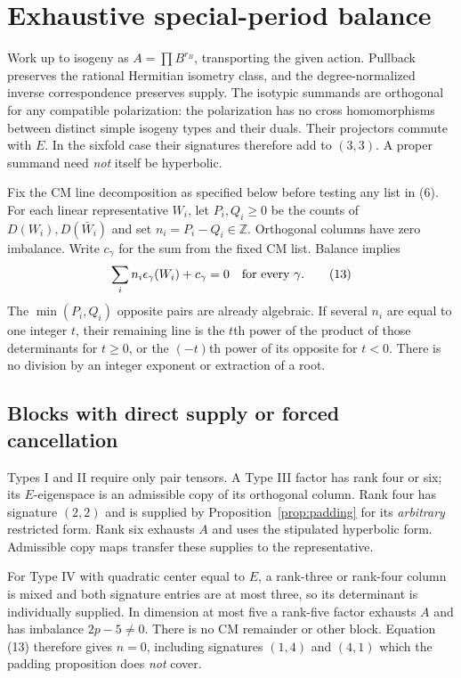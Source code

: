 \documentclass[11pt]{article}
\newcommand{\Z}{\mathbb Z}
\theoremstyle{remark}
\begin{document}
\section{Exhaustive special-period balance}

Work up to isogeny as $A=\prod B^{r_B}$, transporting the given action.
Pullback preserves the rational Hermitian isometry class, and the
degree-normalized inverse correspondence preserves supply.
The isotypic summands are orthogonal for any compatible polarization:
the polarization has no cross homomorphisms between distinct simple
isogeny types and their duals. Their projectors commute with $E$.
In the sixfold case their signatures therefore add to $(3,3)$.
A proper summand need \emph{not} itself be hyperbolic.

Fix the CM line decomposition as specified below before testing any
list in (6). For each linear representative $W_i$, let
$P_i,Q_i\geq0$ be the counts of $D(W_i),D(\bar W_i)$ and set
$n_i=P_i-Q_i\in\Z$. Orthogonal columns have zero imbalance.
Write $c_\gamma$ for the sum from the fixed CM list. Balance implies
\[
 \sum_i n_i\epsilon_\gamma(W_i)+c_\gamma=0
                    \quad\hbox{for every }\gamma.
 \tag{13}\label{eq:net}
\]
The $\min(P_i,Q_i)$ opposite pairs are already algebraic.
If several $n_i$ are equal to one integer $t$, their remaining line is
the $t$th power of the product of those determinants for $t\geq0$,
or the $(-t)$th power of its opposite for $t<0$.
There is no division by an integer exponent or extraction of a root.

\subsection{Blocks with direct supply or forced cancellation}

Types I and II require only pair tensors. A Type III factor has rank
four or six; its $E$-eigenspace is an admissible copy of its orthogonal
column. Rank four has signature $(2,2)$ and is supplied by
Proposition~\ref{prop:padding} for its \emph{arbitrary} restricted form.
Rank six exhausts $A$ and uses the stipulated hyperbolic form.
Admissible copy maps transfer these supplies to the representative.

For Type IV with quadratic center equal to $E$, a rank-three or
rank-four column is mixed and both signature entries are at most three,
so its determinant is individually supplied.
In dimension at most five a rank-five factor exhausts $A$ and has
imbalance $2p-5\ne0$. There is no CM remainder or other block.
Equation (13) therefore gives $n=0$, including signatures $(1,4)$
and $(4,1)$ which the padding proposition does \emph{not} cover.
\end{document}
